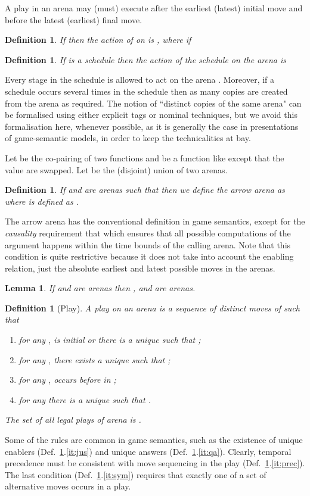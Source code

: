 \documentclass{article}
\newtheorem{definition}[theorem]{Definition}
\newtheorem{lemma}[theorem]{Lemma}
\begin{document}
A play in an arena may (must) execute after the earliest (latest) initial move and before the latest (earliest) final move. 
\begin{definition}
If  then the action of  on  is 
,
where  if 
\end{definition}
\begin{definition}\label{def:schedact}
If  is a schedule then the action of the schedule on the arena  is 

\end{definition}
Every stage in the schedule is allowed to act on the arena . Moreover, if a schedule occurs several times in the schedule then as many copies are created from the arena as required. The notion of ``distinct copies of the same arena" can be formalised using either explicit tags or nominal techniques, but we avoid this formalisation here, whenever possible, as it is generally the case in presentations of game-semantic models, in order to keep the technicalities at bay. 

Let  be the co-pairing of two functions and  be a function like  except that the  value are swapped. Let  be the (disjoint) union of two arenas. 
\begin{definition}
If  and  are arenas such that  then we define the \emph{arrow} arena as  where  is defined as .
\end{definition}
The arrow arena has the conventional definition in game semantics, except for the \emph{causality} requirement that  which ensures that all possible computations of the argument happens within the time bounds of the calling arena. Note that this condition is quite restrictive because it does not take into account the enabling relation, just the absolute earliest and latest possible moves in the arenas.
\begin{lemma}
If  and  are arenas then ,  and  are arenas. 
\end{lemma}

\begin{definition}[Play]\label{def:play}
A play  on an arena  is a sequence of \emph{distinct} moves of  such that 
\begin{enumerate}
\item\label{it:jus} for any ,  is initial or there is a unique  such that ;
\item\label{it:qa}  for any , there exists a unique  such that ;
\item\label{it:prec}  for any ,  occurs before  in ;
\item\label{it:sym}  
for any   there is a unique  such that . 
\end{enumerate}
The set of all legal plays of arena  is . 
\end{definition}
Some of the rules are common in game semantics, such as the existence of unique enablers (Def.~\ref{def:play}.\ref{it:jus}) and unique answers (Def.~\ref{def:play}.\ref{it:qa}). Clearly, temporal precedence must be consistent with move sequencing in the play (Def.~\ref{def:play}.\ref{it:prec}). The last condition (Def.~\ref{def:play}.\ref{it:sym}) requires that exactly one of a set of alternative moves occurs in a play. 
\end{document}

